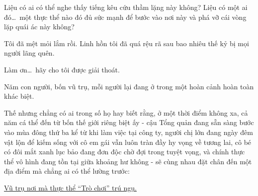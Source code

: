 \documentclass[../main.tex]{subfiles}
\begin{document}
Liệu có ai có thể nghe thấy tiếng kêu cứu thầm lặng này không? Liệu có một ai đó\dots\ một thực thể nào đó đủ sức mạnh để bước vào nơi này và phá vỡ cái vòng lặp quái ác này không?

Tôi đã mệt mỏi lắm rồi. Linh hồn tôi đã quá rệu rã sau bao nhiêu thế kỷ bị mọi người lãng quên.

Làm ơn\dots\ hãy cho tôi được giải thoát.

\il

Năm con người, bốn vũ trụ, mỗi người lại đang ở trong một hoàn cảnh hoàn toàn khác biệt.

Thế nhưng chẳng có ai trong số họ hay biết rằng, ở một thời điểm không xa, cả năm cá thể đến từ bốn thế giới riêng biệt ấy - cậu Tổng quản đang sẵn sàng bước vào mùa đông thứ ba kể từ khi làm việc tại công ty, người chị lớn đang ngày đêm vật lộn để kiếm sống với cô em gái vẫn luôn tràn đầy hy vọng về tương lai, cô bé có đôi mắt xanh lục bảo đang đơn độc chờ đợi trong tuyệt vọng, và chính thực thể vô hình đang tồn tại giữa khoảng hư không - sẽ cùng nhau đặt chân đến một địa điểm mà chẳng ai có thể lường trước:

\begin{center}
  \uline{Vũ trụ nơi mà thực thể ``Trò chơi'' trú ngụ.}
\end{center}
\end{document}
